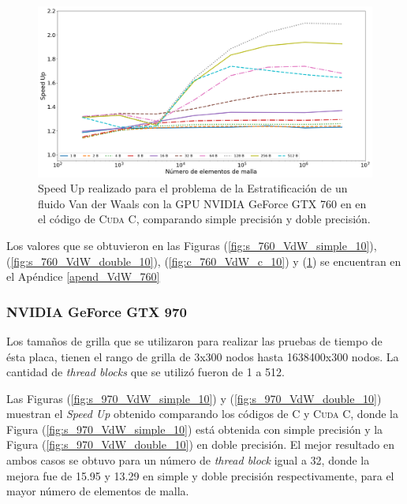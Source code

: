 \begin{figure}[htbp]
	\centering
	\includegraphics[width=\textwidth]{figs/cap4/c_760_MxC_cuda_10}
	\caption{Speed Up realizado para el problema de la Estratificación de un fluido Van der Waals con la GPU NVIDIA GeForce GTX 760 en en el código de \textsc{Cuda C}, comparando simple precisión y doble precisión.} 
	\label{fig:c_760_VdW_cuda_10}	
\end{figure}

Los valores que se obtuvieron en las Figuras (\ref{fig:s_760_VdW_simple_10}), (\ref{fig:s_760_VdW_double_10}), (\ref{fig:c_760_VdW_c_10}) y (\ref{fig:c_760_VdW_cuda_10}) se encuentran en el Apéndice \ref{apend_VdW_760}

\newpage

\subsubsection{NVIDIA GeForce GTX 970}

Los tamaños de grilla que se utilizaron para realizar las pruebas de tiempo de ésta placa, tienen el rango de grilla de 3x300 nodos hasta 1638400x300 nodos. La cantidad de \textit{thread blocks} que se utilizó fueron de 1 a 512.

Las Figuras (\ref{fig:s_970_VdW_simple_10}) y (\ref{fig:s_970_VdW_double_10}) muestran el \textit{Speed Up} obtenido comparando los códigos de \textsc{C} y \textsc{Cuda C}, donde la Figura (\ref{fig:s_970_VdW_simple_10}) está obtenida con simple precisión y la Figura (\ref{fig:s_970_VdW_double_10}) en doble precisión. El mejor resultado en ambos casos se obtuvo para un número de \textit{thread block} igual a 32, donde la mejora fue de 15.95 y 13.29 en simple y doble precisión respectivamente, para el mayor número de elementos de malla.


